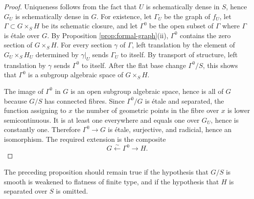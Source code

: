 \begin{proof}
Uniqueness follows from the fact that $U$ is schematically dense in $S$, hence $G_U$ is schematically dense in $G$. For existence, let $\Gamma_U$ be the graph of $f_U$, let $\Gamma\subset G\times_S H$ be its schematic closure, and let $\Gamma^0$ be the open subset of $\Gamma$ where $\Gamma$ is étale over $G$. By Proposition \ref{prop:formal-graph}(ii), $\Gamma^0$ contains the zero section of $G\times_S H$. For every section $\gamma$ of $\Gamma$, left translation by the element of $G_U\times_S H_U$ determined by $\gamma|_U$ sends $\Gamma_U$ to itself. By transport of structure, left translation by $\gamma$ sends $\Gamma^0$ to itself. After the flat base change $\Gamma^0/S$, this shows that $\Gamma^0$ is a subgroup algebraic space of $G\times_S H$.

The image of $\Gamma^0$ in $G$ is an open subgroup algebraic space, hence is all of $G$ because $G/S$ has connected fibres. Since $\Gamma^0/G$ is étale and separated, the function assigning to $x$ the number of geometric points in the fibre over $x$ is lower semicontinuous. It is at least one everywhere and equals one over $G_U$, hence is constantly one. Therefore $\Gamma^0\to G$ is étale, surjective, and radicial, hence an isomorphism. The required extension is the composite
\[
  G\xleftarrow{\sim}\Gamma^0\longrightarrow H.
\]
\end{proof}

The preceding proposition should remain true if the hypothesis that $G/S$ is smooth is weakened to flatness of finite type, and if the hypothesis that $H$ is separated over $S$ is omitted.

